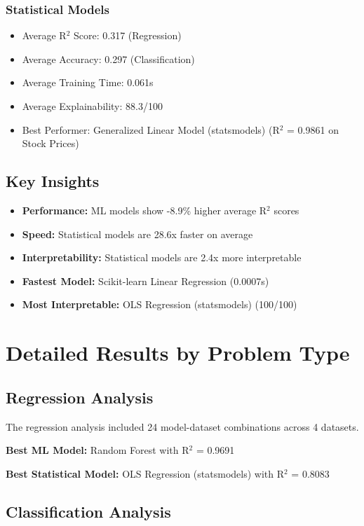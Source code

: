 \documentclass[11pt,a4paper]{article}
\begin{document}
\subsubsection{Statistical Models}
\begin{itemize}
\item Average R$^2$ Score: 0.317 (Regression)
\item Average Accuracy: 0.297 (Classification)
\item Average Training Time: 0.061s
\item Average Explainability: 88.3/100
\item Best Performer: Generalized Linear Model (statsmodels) (R$^2$ = 0.9861 on Stock Prices)
\end{itemize}

\subsection{Key Insights}

\begin{itemize}
\item \textbf{Performance:} ML models show -8.9\% higher average R$^2$ scores
\item \textbf{Speed:} Statistical models are 28.6x faster on average
\item \textbf{Interpretability:} Statistical models are 2.4x more interpretable
\item \textbf{Fastest Model:} Scikit-learn Linear Regression (0.0007s)
\item \textbf{Most Interpretable:} OLS Regression (statsmodels) (100/100)
\end{itemize}

\section{Detailed Results by Problem Type}

\subsection{Regression Analysis}

The regression analysis included 24 model-dataset combinations across 4 datasets.

\textbf{Best ML Model:} Random Forest with R$^2$ = 0.9691

\textbf{Best Statistical Model:} OLS Regression (statsmodels) with R$^2$ = 0.8083

\subsection{Classification Analysis}
\end{document}
